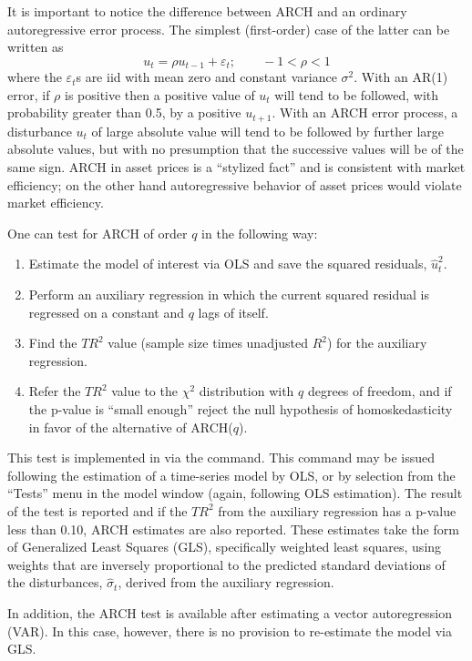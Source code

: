 It is important to notice the difference between ARCH and an ordinary
autoregressive error process.  The simplest (first-order) case of the
latter can be written as
\[
u_t = \rho u_{t-1} + \varepsilon_t; \qquad -1 < \rho < 1
\]
where the $\varepsilon_t$s are iid with mean zero and constant
variance $\sigma^2$.  With an AR(1) error, if $\rho$ is positive then
a positive value of $u_t$ will tend to be followed, with probability
greater than 0.5, by a positive $u_{t+1}$.  With an ARCH error
process, a disturbance $u_t$ of large absolute value will tend to be
followed by further large absolute values, but with no presumption
that the successive values will be of the same sign.  ARCH in asset
prices is a ``stylized fact'' and is consistent with market
efficiency; on the other hand autoregressive behavior of asset prices
would violate market efficiency.

One can test for ARCH of order $q$ in the following
way:
\begin{enumerate}
\item Estimate the model of interest via OLS and save the squared
  residuals, $\hat{u}^2_t$.
\item Perform an auxiliary regression in which the current squared
  residual is regressed on a constant and $q$ lags of itself.
\item Find the $TR^2$ value (sample size times unadjusted $R^2$) for
  the auxiliary regression.
\item Refer the $TR^2$ value to the $\chi^2$ distribution with $q$
  degrees of freedom, and if the p-value is ``small enough'' reject
  the null hypothesis of homoskedasticity in favor of the alternative
  of ARCH($q$).
\end{enumerate}

This test is implemented in  via the  command.
This command may be issued following the estimation of a time-series
model by OLS, or by selection from the ``Tests'' menu in the model
window (again, following OLS estimation).  The result of the test is
reported and if the $TR^2$ from the auxiliary regression has a p-value
less than 0.10, ARCH estimates are also reported.  These estimates
take the form of Generalized Least Squares (GLS), specifically
weighted least squares, using weights that are inversely proportional
to the predicted standard deviations of the disturbances,
$\hat{\sigma}_t$, derived from the auxiliary regression.

In addition, the ARCH test is available after estimating a vector
autoregression (VAR).  In this case, however, there is no provision to
re-estimate the model via GLS.

